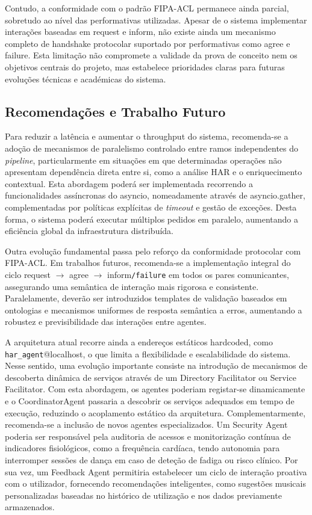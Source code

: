 \documentclass[runningheads]{llncs}
\begin{document}
Contudo, a conformidade com o padrão FIPA-ACL permanece ainda parcial, sobretudo ao nível das performativas utilizadas. Apesar de o sistema implementar interações baseadas em request e inform, não existe ainda um mecanismo completo de handshake protocolar suportado por performativas como agree e failure. Esta limitação não compromete a validade da prova de conceito nem os objetivos centrais do projeto, mas estabelece prioridades claras para futuras evoluções técnicas e académicas do sistema. 

\subsection{Recomendações e Trabalho Futuro}
Para reduzir a latência e aumentar o throughput do sistema, recomenda-se a adoção de mecanismos de paralelismo controlado entre ramos independentes do \textit{pipeline}, particularmente em situações em que determinadas operações não apresentam dependência direta entre si, como a análise HAR e o enriquecimento contextual. Esta abordagem poderá ser implementada recorrendo a funcionalidades assíncronas do asyncio, nomeadamente através de asyncio.gather, complementadas por políticas explícitas de \textit{timeout} e gestão de exceções. Desta forma, o sistema poderá executar múltiplos pedidos em paralelo, aumentando a eficiência global da infraestrutura distribuída. 

Outra evolução fundamental passa pelo reforço da conformidade protocolar com FIPA-ACL. Em trabalhos futuros, recomenda-se a implementação integral do ciclo request $\rightarrow$ agree $\rightarrow$ inform\texttt{/failure} em todos os pares comunicantes, assegurando uma semântica de interação mais rigorosa e consistente. Paralelamente, deverão ser introduzidos templates de validação baseados em ontologias e mecanismos uniformes de resposta semântica a erros, aumentando a robustez e previsibilidade das interações entre agentes. 

A arquitetura atual recorre ainda a endereços estáticos hardcoded, como \texttt{har\_agent}@localhost, o que limita a flexibilidade e escalabilidade do sistema. Nesse sentido, uma evolução importante consiste na introdução de mecanismos de descoberta dinâmica de serviços através de um Directory Facilitator ou Service Facilitator. Com esta abordagem, os agentes poderiam registar-se dinamicamente e o CoordinatorAgent passaria a descobrir os serviços adequados em tempo de execução, reduzindo o acoplamento estático da arquitetura. Complementarmente, recomenda-se a inclusão de novos agentes especializados. Um Security Agent poderia ser responsável pela auditoria de acessos e monitorização contínua de indicadores fisiológicos, como a frequência cardíaca, tendo autonomia para interromper sessões de dança em caso de deteção de fadiga ou risco clínico. Por sua vez, um Feedback Agent permitiria estabelecer um ciclo de interação proativa com o utilizador, fornecendo recomendações inteligentes, como sugestões musicais personalizadas baseadas no histórico de utilização e nos dados previamente armazenados. 
\end{document}
